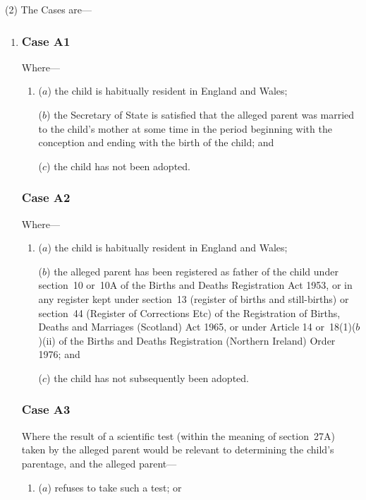 \documentclass[12pt,a4paper]{article}
\begin{document}
(2) The Cases are—
\begin{enumerate}\item[]
\subsubsection*{Case A1}

Where—
\begin{enumerate}\item[]
($a$) the child is habitually resident in England and Wales;

($b$) the 
Secretary of State  %
is satisfied that the alleged parent was married to the child’s mother at some time in the period beginning with the conception and ending with the birth of the child; and

($c$) the child has not been adopted.
\end{enumerate}

\subsubsection*{Case A2}

Where—
\begin{enumerate}\item[]
($a$) the child is habitually resident in England and Wales;

($b$) the alleged parent has been registered as father of the child under section~10 or~10A of the Births and Deaths Registration Act 1953, or in any register kept under section~13 (register of births and still-births) or section~44 (Register of Corrections Etc) of the Registration of Births, Deaths and Marriages (Scotland) Act 1965, or under Article 14 or~18(1)($b$)(ii)  of the Births and Deaths Registration (Northern Ireland) Order 1976; and

($c$) the child has not subsequently been adopted.
\end{enumerate}

\subsubsection*{Case A3}

Where the result of a scientific test (within the meaning of section~27A) taken by the alleged parent would be relevant to determining the child’s parentage, and the alleged parent—
\begin{enumerate}\item[]
($a$) refuses to take such a test; or


\end{enumerate}
\end{enumerate}
\end{document}

